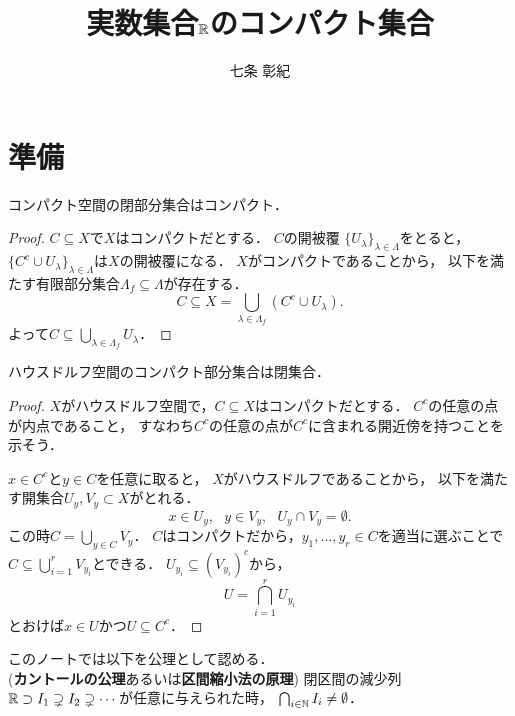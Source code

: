 \documentclass[]{jsarticle}
\title{実数集合$\mathbb{R}$のコンパクト集合}
\author{七条 彰紀}
\begin{document}
\maketitle

\section{準備}
\begin{Lemma}\label{lemma:1}
    コンパクト空間の閉部分集合はコンパクト．
\end{Lemma}
\begin{proof}
    $C \subseteq X$で$X$はコンパクトだとする．
    $C$の開被覆 $\{U_{\lambda}\}_{\lambda \in \Lambda}$をとると，
    $\{C^c \cup U_{\lambda}\}_{\lambda \in \Lambda}$は$X$の開被覆になる．
    $X$がコンパクトであることから，
    以下を満たす有限部分集合$\Lambda_f \subseteq \Lambda$が存在する．
    \[ C \subseteq X=\bigcup_{\lambda \in \Lambda_f} (C^c \cup U_{\lambda}). \]
    よって$C \subseteq \bigcup_{\lambda \in \Lambda_f} U_{\lambda}$．
\end{proof}

\begin{Lemma}\label{lemma:2}
    ハウスドルフ空間のコンパクト部分集合は閉集合．
\end{Lemma}
\begin{proof}
    $X$がハウスドルフ空間で，$C \subseteq X$はコンパクトだとする．
    $C^c$の任意の点が内点であること，
    すなわち$C^c$の任意の点が$C^c$に含まれる開近傍を持つことを示そう．

    $x \in C^c$と$y \in C$を任意に取ると，
    $X$がハウスドルフであることから，
    以下を満たす開集合$U_y, V_y \subset X$がとれる．
    \[ x \in U_y,~~~ y \in V_y,~~~ U_y \cap V_y = \emptyset. \]
    この時$C=\bigcup_{y \in C} V_y$．
    $C$はコンパクトだから，$y_1,\dots,y_r \in C$を適当に選ぶことで
    $C \subseteq \bigcup_{i=1}^r V_{y_i}$とできる．
    $U_{y_i} \subseteq (V_{y_i})^c$から，
    \[ U=\bigcap_{i=1}^r U_{y_i} \]
    とおけば$x \in U$かつ$U \subseteq C^c$．
\end{proof}

\begin{Remark}\label{remark:1}
    このノートでは以下を公理として認める． \\
    (\textbf{カントールの公理}あるいは\textbf{区間縮小法の原理})
    閉区間の減少列 $\mathbb{R} \supset I_1 \supsetneq I_2 \supsetneq \cdots$が任意に与えられた時，
    $\bigcap_{i \in \mathbb{N}} I_i \neq \emptyset$．
\end{Remark}
\end{document}
